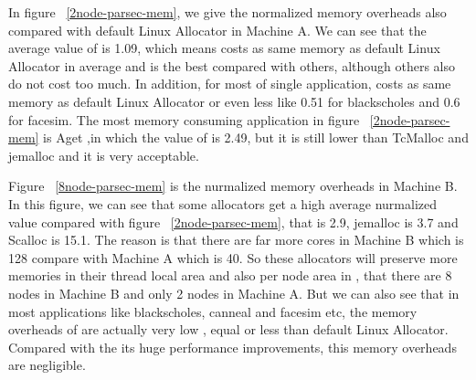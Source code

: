 In figure ~\ref{2node-parsec-mem}, we give the normalized memory overheads also compared with default Linux Allocator in Machine A. We can see that the average value of \NM{} is 1.09, which means \NM{} costs as same memory as default Linux Allocator in average and \NM{} is the best compared with others, although others also do not cost too much. In addition, for most of single application, \NM{} costs as same memory as default Linux Allocator or even less like 0.51 for blackscholes and 0.6 for facesim. The most memory consuming application in figure ~\ref{2node-parsec-mem} is Aget ,in which the value of \NM{} is 2.49, but it is still lower than TcMalloc and jemalloc and it is very acceptable. 

Figure ~\ref{8node-parsec-mem} is the nurmalized memory overheads in Machine B. In this figure, we can see that some allocators get a high average nurmalized value compared with figure ~\ref{2node-parsec-mem}, that \NM{} is 2.9, jemalloc is 3.7 and Scalloc is 15.1. The reason is that there are far more cores in Machine B which is 128 compare with Machine A which is 40. So these allocators will preserve more memories in their thread local area and also per node area in \NM{}, that there are 8 nodes in Machine B and only 2 nodes in Machine A. But we can also see that in most applications like blackscholes, canneal and facesim etc, the memory overheads of \NM{} are actually very low , equal or less than default Linux Allocator. Compared with the its huge performance improvements, this memory overheads are negligible.

